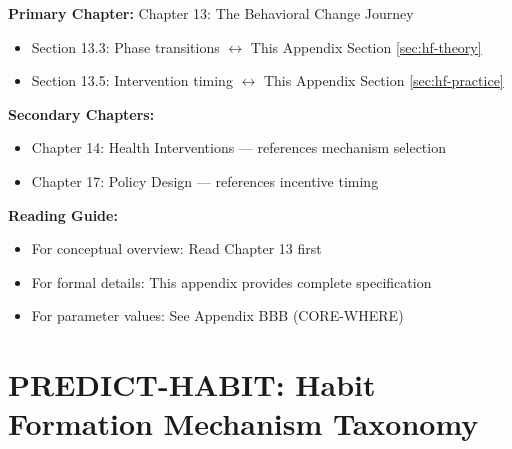 \begin{tcolorbox}[colback=purple!5!white, colframe=purple!75!black,
    title=Chapter Linkage]

\textbf{Primary Chapter:} Chapter 13: The Behavioral Change Journey
\begin{itemize}[nosep]
\item Section 13.3: Phase transitions $\leftrightarrow$ This Appendix Section \ref{sec:hf-theory}
\item Section 13.5: Intervention timing $\leftrightarrow$ This Appendix Section \ref{sec:hf-practice}
\end{itemize}

\textbf{Secondary Chapters:}
\begin{itemize}[nosep]
\item Chapter 14: Health Interventions --- references mechanism selection
\item Chapter 17: Policy Design --- references incentive timing
\end{itemize}

\textbf{Reading Guide:}
\begin{itemize}[nosep]
\item For conceptual overview: Read Chapter 13 first
\item For formal details: This appendix provides complete specification
\item For parameter values: See Appendix BBB (CORE-WHERE)
\end{itemize}

\end{tcolorbox}

\chapter{PREDICT-HABIT: Habit Formation Mechanism Taxonomy}
\label{app:predict-habit}

\begin{abstract}
How do behaviors become habits? This appendix formalizes three competing mechanisms:
(1) learning/experience-good, (2) addiction/reinforcement, and (3) inertia/switching-costs.
Each mechanism generates distinct testable predictions about the temporal pattern of
behavior persistence. We document that Jones, Molitor \& Reif (2025) provides a clean
falsification of addiction models in favor of experience-good learning for annual health
screenings. The key insight: first exposure dominates subsequent exposures in driving
habit formation, with implications for intervention design across domains.
\end{abstract}


